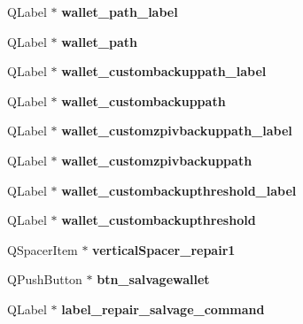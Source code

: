 \begin{DoxyCompactItemize}
Q\+Label $\ast$ {\bfseries wallet\+\_\+path\+\_\+label}
\item 
\mbox{\label{class_ui___r_p_c_console_ae79f296fa4cb68faa99f599daf13c5eb}} 
Q\+Label $\ast$ {\bfseries wallet\+\_\+path}
\item 
\mbox{\label{class_ui___r_p_c_console_ad0164afb5e67d4b5b5353d7f2ebfe657}} 
Q\+Label $\ast$ {\bfseries wallet\+\_\+custombackuppath\+\_\+label}
\item 
\mbox{\label{class_ui___r_p_c_console_ae02f67cc3ca897028f714c8c0bef32be}} 
Q\+Label $\ast$ {\bfseries wallet\+\_\+custombackuppath}
\item 
\mbox{\label{class_ui___r_p_c_console_aedc1e0b8d044b8b5da3c989ff048bbcb}} 
Q\+Label $\ast$ {\bfseries wallet\+\_\+customzpivbackuppath\+\_\+label}
\item 
\mbox{\label{class_ui___r_p_c_console_a4a433499ecbcccd85af90502a3c2ee00}} 
Q\+Label $\ast$ {\bfseries wallet\+\_\+customzpivbackuppath}
\item 
\mbox{\label{class_ui___r_p_c_console_a2cd7867ce63f4fb214ae9a2e50dc1019}} 
Q\+Label $\ast$ {\bfseries wallet\+\_\+custombackupthreshold\+\_\+label}
\item 
\mbox{\label{class_ui___r_p_c_console_a7d0eead31edc2b9d8180c9134db90024}} 
Q\+Label $\ast$ {\bfseries wallet\+\_\+custombackupthreshold}
\item 
\mbox{\label{class_ui___r_p_c_console_a83135d1863636dbc90fe9cf2e47037c1}} 
Q\+Spacer\+Item $\ast$ {\bfseries vertical\+Spacer\+\_\+repair1}
\item 
\mbox{\label{class_ui___r_p_c_console_a3b25b09a82abb18d65b6918d6e9a5cec}} 
Q\+Push\+Button $\ast$ {\bfseries btn\+\_\+salvagewallet}
\item 
\mbox{\label{class_ui___r_p_c_console_a5d79c0dcfff447d18042cb3141ce7a2e}} 
Q\+Label $\ast$ {\bfseries label\+\_\+repair\+\_\+salvage\+\_\+command}

\end{DoxyCompactItemize}
